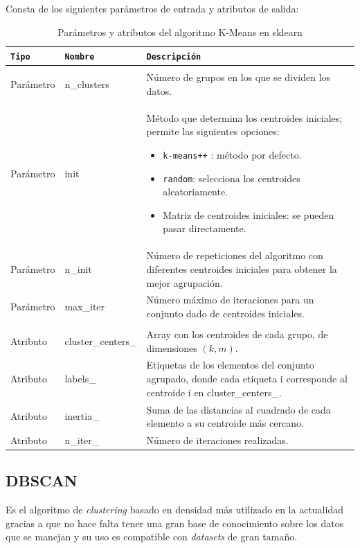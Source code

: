 Consta de los siguientes parámetros de entrada y atributos de salida:

\begin{table}[H]
\centering
\footnotesize
\renewcommand{\arraystretch}{1.1}
\begin{tabularx}{\textwidth}{|p{3cm}|p{2.25cm}|X|}
\hline
\rowcolor{graylight}\texttt{Tipo} & \texttt{Nombre} & \texttt{Descripción} \\
\hline
\rowcolor{graylight}\multicolumn{3}{|c|}{\texttt{Parámetros de entrada}} \\
\hline
Parámetro & n\_clusters & Número de grupos en los que se dividen los datos. \\
\hline
Parámetro & init & Método que determina los centroides iniciales; permite las siguientes opciones:
\begin{itemize}
    \item \texttt{k-means++} \cite{arthur2007kmeans}: método por defecto.
    \item \texttt{random}: selecciona los centroides aleatoriamente.
    \item Matriz de centroides iniciales: se pueden pasar directamente.
\end{itemize} \\
\hline
Parámetro & n\_init & Número de repeticiones del algoritmo con diferentes centroides iniciales para obtener la mejor agrupación. \\
\hline
Parámetro & max\_iter & Número máximo de iteraciones para un conjunto dado de centroides iniciales. \\
\hline
\rowcolor{graylight}\multicolumn{3}{|c|}{\texttt{Atributos de salida}} \\
\hline
Atributo & cluster\_centers\_ & Array con los centroides de cada grupo, de dimensiones \( (k, m) \). \\
\hline
Atributo & labels\_ & Etiquetas de los elementos del conjunto agrupado, donde cada etiqueta i corresponde al centroide i en cluster\_centers\_. \\
\hline
Atributo & inertia\_ & Suma de las distancias al cuadrado de cada elemento a su centroide más cercano. \\
\hline
Atributo & n\_iter\_ & Número de iteraciones realizadas. \\
\hline
\end{tabularx}
\caption{Parámetros y atributos del algoritmo K-Means en sklearn}
\label{tab:kmeans}
\end{table}


\subsection{DBSCAN}
\label{dbscan}
Es el algoritmo de \textit{clustering} basado en densidad más utilizado en la actualidad \cite{10.1145/3068335} gracias a que no hace falta tener una gran base de conocimiento sobre los datos que se manejan y su uso es compatible con \textit{datasets} de gran tamaño.

